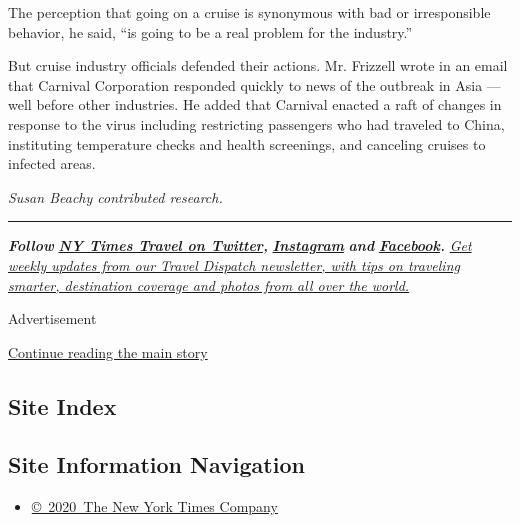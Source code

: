 The perception that going on a cruise is synonymous with bad or
irresponsible behavior, he said, ``is going to be a real problem for the
industry.''

But cruise industry officials defended their actions. Mr. Frizzell wrote
in an email that Carnival Corporation responded quickly to news of the
outbreak in Asia --- well before other industries. He added that
Carnival enacted a raft of changes in response to the virus including
restricting passengers who had traveled to China, instituting
temperature checks and health screenings, and canceling cruises to
infected areas.

\emph{Susan Beachy contributed research.}

\begin{center}\rule{0.5\linewidth}{\linethickness}\end{center}

\emph{\textbf{Follow}}
\textbf{\href{https://twitter.com/nytimestravel}{\emph{NY Times Travel
on Twitter}}\emph{,}}
\textbf{\href{https://www.instagram.com/nytimestravel/}{\emph{Instagram}}}
\emph{\textbf{and}}
\textbf{\href{https://www.facebookcorewwwi.onion/nytimestravel/}{\emph{Facebook}}\emph{.}}
\href{https://www.nytimes3xbfgragh.onion/newsletters/traveldispatch}{\emph{Get
weekly updates from our Travel Dispatch newsletter, with tips on
traveling smarter, destination coverage and photos from all over the
world.}}

Advertisement

\protect\hyperlink{after-bottom}{Continue reading the main story}

\hypertarget{site-index}{%
\subsection{Site Index}\label{site-index}}

\hypertarget{site-information-navigation}{%
\subsection{Site Information
Navigation}\label{site-information-navigation}}

\begin{itemize}
\tightlist
\item
  \href{https://help.nytimes3xbfgragh.onion/hc/en-us/articles/115014792127-Copyright-notice}{©~2020~The
  New York Times Company}
\end{itemize}

